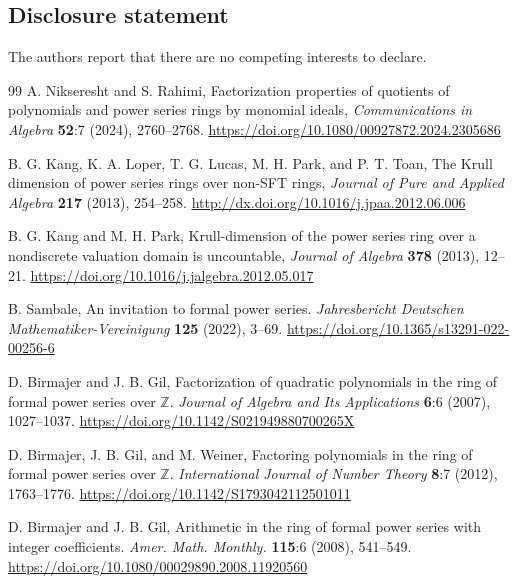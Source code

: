 \documentclass[12pt,reqno]{amsart}%
\begin{document}
\subsection*{Disclosure statement}
The authors report that there are no competing interests to declare.
\begin{thebibliography}{99}
 {A. Nikseresht and S. Rahimi}, {{Factorization properties of quotients of polynomials and power series rings by monomial ideals}}, \emph{Communications in Algebra} \textbf{52}:{7} (2024), {2760--2768}. \url{https://doi.org/10.1080/00927872.2024.2305686}

 B. G. Kang, K. A. Loper, T. G. Lucas, M. H. Park, and P. T. Toan, {{The Krull dimension of power series rings over non-SFT rings}}, \emph{Journal of Pure and Applied Algebra} {\textbf{217}} (2013), 254--258. \url{http://dx.doi.org/10.1016/j.jpaa.2012.06.006}

 B. G. Kang  and M. H. Park, {{Krull-dimension of the power series ring over a nondiscrete valuation domain is uncountable}}, \emph{Journal of Algebra} {\textbf{378}} (2013), 12--21. \url{https://doi.org/10.1016/j.jalgebra.2012.05.017}

 B. Sambale, An invitation to formal power series. \emph{Jahresbericht Deutschen Mathematiker-Vereinigung}  \textbf{125} (2022), 3--69. \url{https://doi.org/10.1365/s13291-022-00256-6}

 D. Birmajer and J. B. Gil, Factorization of quadratic polynomials in the ring of formal power series over $\mathbb{Z}$. \emph{Journal of Algebra and Its Applications} \textbf{6}:6 (2007), 1027--1037. \url{https://doi.org/10.1142/S021949880700265X}

 D. Birmajer, J. B. Gil, and M. Weiner, Factoring polynomials in the ring of formal power series over $\mathbb{Z}$. \emph{International Journal of Number Theory} \textbf{8}:7 (2012), 1763--1776. \url{https://doi.org/10.1142/S1793042112501011}

 D. Birmajer and J. B. Gil, Arithmetic in the ring of formal power series with integer coefficients. \emph{Amer. Math. Monthly.} \textbf{115}:6 (2008), 541--549. \url{https://doi.org/10.1080/00029890.2008.11920560}


\end{thebibliography}
\end{document}
